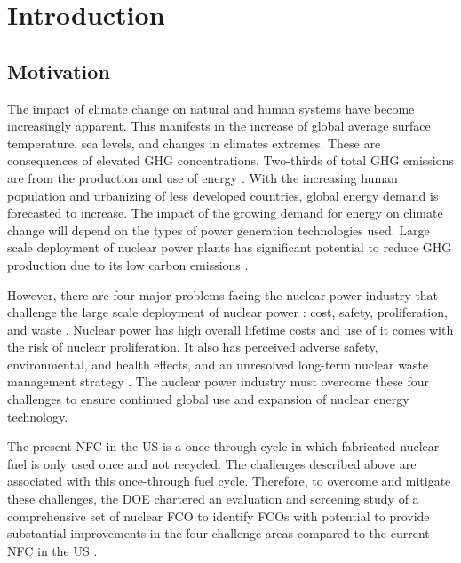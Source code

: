 \chapter[Introduction]{Introduction}
\label{chap:1}

\section{Motivation}

The impact of climate change on natural and human systems have 
become increasingly apparent.
This manifests in the increase of global average surface 
temperature, sea levels, and changes in climates extremes.
These are consequences of elevated \gls{GHG} concentrations. 
Two-thirds of total \gls{GHG} emissions are from the production 
and use of energy \cite{noauthor_climate_2018}. 
With the increasing human population and urbanizing of less 
developed countries, global energy demand is forecasted to 
increase. 
The impact of the growing demand for energy on climate change 
will depend on the 
types of power generation technologies used. 
Large scale deployment of nuclear power plants has significant 
potential to reduce \gls{GHG} production due to its low 
carbon emissions \cite{noauthor_climate_2018}.  


However, there are four major problems facing the nuclear power 
industry
that challenge the large scale deployment of nuclear power 
: cost, safety, proliferation, and waste 
\cite{massachusetts_institute_of_technology_future_2003}. 
Nuclear power has high overall lifetime costs and use of it comes 
with the risk of nuclear proliferation. 
It also has perceived adverse safety, environmental, and health 
effects, and an unresolved long-term nuclear waste management 
strategy \cite{massachusetts_institute_of_technology_future_2003}. 
The nuclear power industry must overcome these four challenges 
to ensure continued global use and expansion 
of nuclear energy technology. 

The present \gls{NFC} in the \gls{US} is a once-through cycle 
in which fabricated nuclear fuel is only used once and not recycled. 
The challenges described above are associated with this 
once-through fuel cycle. 
Therefore, to overcome and mitigate these challenges, the 
\gls{DOE} chartered an evaluation and screening study 
of a comprehensive set of nuclear \gls{FCO} 
to identify \glspl{FCO} with potential 
to provide substantial improvements in the four challenge areas
compared to the current 
\gls{NFC} in the \gls{US} \cite{wigeland_nuclear_2014}. 

